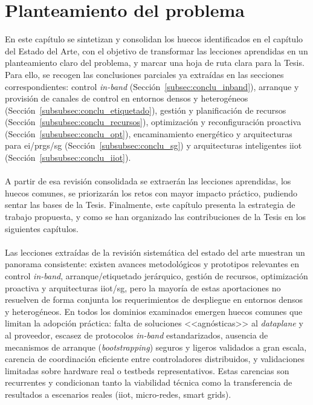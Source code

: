 \chapter{Planteamiento del problema}
\label{ch:problema}

En este capítulo se sintetizan y consolidan los huecos identificados en el capítulo del Estado del Arte, con el objetivo de transformar las lecciones aprendidas en un planteamiento claro del problema, y marcar una hoja de ruta clara para la Tesis. Para ello, se recogen las conclusiones parciales ya extraídas en las secciones correspondientes: control \textit{in-band} (Sección~\ref{subsec:conclu_inband}), arranque y provisión de canales de control en entornos densos y heterogéneos (Sección~\ref{subsubsec:conclu_etiquetado}), gestión y planificación de recursos (Sección~\ref{subsubsec:conclu_recursos}), optimización y reconfiguración proactiva (Sección~\ref{subsubsec:conclu_opt}), encaminamiento energético y arquitecturas para \gls{ei}/\glspl{prg}/\gls{sg} (Sección~\ref{subsubsec:conclu_sg}) y arquitecturas inteligentes \gls{iiot} (Sección~\ref{subsubsec:conclu_iiot}).\\
\\
A partir de esa revisión consolidada se extraerán las lecciones aprendidas, los huecos comunes, se priorizarán los retos con mayor impacto práctico, pudiendo sentar las bases de la Tesis. Finalmente, este capítulo presenta la estrategia de trabajo propuesta, y como se han organizado las contribuciones de la Tesis en los siguientes capítulos.\\
\\
Las lecciones extraídas de la revisión sistemática del estado del arte muestran un panorama consistente: existen avances metodológicos y prototipos relevantes en control \textit{in-band}, arranque/etiquetado jerárquico, gestión de recursos, optimización proactiva y arquitecturas \gls{iiot}/\gls{sg}, pero la mayoría de estas aportaciones no resuelven de forma conjunta los requerimientos de despliegue en entornos densos y heterogéneos. En todos los dominios examinados emergen huecos comunes que limitan la adopción práctica: falta de soluciones <<agnósticas>> al \textit{dataplane} y al proveedor, escasez de protocolos \textit{in-band} estandarizados, ausencia de mecanismos de arranque (\textit{bootstrapping}) seguros y ligeros validados a gran escala, carencia de coordinación eficiente entre controladores distribuidos, y validaciones limitadas sobre hardware real o testbeds representativos. Estas carencias son recurrentes y condicionan tanto la viabilidad técnica como la transferencia de resultados a escenarios reales (\gls{iiot}, micro-redes, smart grids).\\
